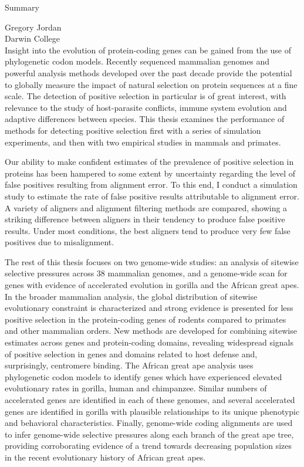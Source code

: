 \begin{center}
\Large \mytitle

\large Summary
\end{center}
\small
\hfill Gregory Jordan \\
\noindent{\today} \hfill Darwin College \\
\small
Insight into the evolution of protein-coding genes can be gained from
the use of phylogenetic codon models. Recently sequenced mammalian
genomes and powerful analysis methods developed over the past decade
provide the potential to globally measure the impact of natural
selection on protein sequences at a fine scale. The detection of
positive selection in particular is of great interest, with relevance
to the study of host-parasite conflicts, immune system evolution and
adaptive differences between species. This thesis examines the
performance of methods for detecting positive selection first with a
series of simulation experiments, and then with two empirical studies
in mammals and primates.

Our ability to make confident estimates of the prevalence of positive
selection in proteins has been hampered to some extent by uncertainty
regarding the level of false positives resulting from alignment
error. To this end, I conduct a simulation study to estimate the rate
of false positive results attributable to alignment error. A variety
of aligners and alignment filtering methods are compared, showing a
striking difference between aligners in their tendency to produce
false positive results. Under most conditions, the best aligners tend
to produce very few false positives due to misalignment.

The rest of this thesis focuses on two genome-wide studies: an
analysis of sitewise selective pressures across 38 mammalian genomes,
and a genome-wide scan for genes with evidence of accelerated
evolution in gorilla and the African great apes. In the broader
mammalian analysis, the global distribution of sitewise evolutionary
constraint is characterized and strong evidence is presented for less
positive selection in the protein-coding genes of rodents compared to
primates and other mammalian orders. New methods are developed for
combining sitewise estimates across genes and protein-coding domains,
revealing widespread signals of positive selection in genes and
domains related to host defense and, surprisingly, centromere
binding. The African great ape analysis uses phylogenetic codon models
to identify genes which have experienced elevated evolutionary rates
in gorilla, human and chimpanzee. Similar numbers of accelerated genes
are identified in each of these genomes, and several accelerated genes
are identified in gorilla with plausible relationships to its unique
phenotypic and behavioral characteristics. Finally, genome-wide coding
alignments are used to infer genome-wide selective pressures along
each branch of the great ape tree, providing corroborating evidence of
a trend towards decreasing population sizes in the recent evolutionary
history of African great apes.
